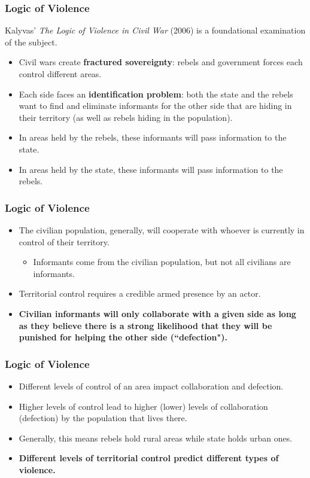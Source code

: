 \documentclass{beamer}
\begin{document}
\begin{frame} 
	\frametitle{\LARGE{Logic of Violence}}
Kalyvas' \textit{The Logic of Violence in Civil War} (2006) is a foundational examination of the subject.
	\begin{itemize}
		\item Civil wars create \textbf{fractured sovereignty}: rebels and government forces each control different areas. \pause
		\item Each side faces an \textbf{identification problem}: both the state and the rebels want to find and eliminate informants for the other side that are hiding in their territory (as well as rebels hiding in the population). \pause
		\item In areas held by the rebels, these informants will pass information to the state.
		\item In areas held by the state, these informants will pass information to the rebels. 
	\end{itemize}
\end{frame}

\begin{frame} 
	\frametitle{\LARGE{Logic of Violence}}
	\begin{itemize}
		\item The civilian population, generally, will cooperate with whoever is currently in control of their territory. \pause
		\begin{itemize}
			\item Informants come from the civilian population, but not all civilians are informants. \pause
		\end{itemize}
		\item Territorial control requires a credible armed presence by an actor.
		\item \textbf{Civilian informants will only collaborate with a given side as long as they believe there is a strong likelihood that they will be punished for helping the other side (``defection").}
	\end{itemize}
\end{frame}

\begin{frame} 
	\frametitle{\LARGE{Logic of Violence}}
	\begin{itemize}
		\item Different levels of control of an area impact collaboration and defection. \pause
		\item Higher levels of control lead to higher (lower) levels of collaboration (defection) by the population that lives there. \pause
		\item Generally, this means rebels hold rural areas while state holds urban ones. \pause
		\item \textbf{Different levels of territorial control predict different types of violence.}
	\end{itemize}
\end{frame}
\end{document}

